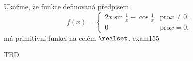 \begin{mathexam}{Ukažme, že funkce definovaná předpisem
  \begin{equation*}
    f(x) = 
    \begin{cases}
       2x\sin\frac{1}{x} - \cos\frac{1}{x} & \text{pro} x\neq0, \\
       0                                   & \text{pro} x=0.
   \end{cases}
  \end{equation*}
  má primitivní funkcí na celém \(\realset\).
  }{exam155} 

  {\centering
    \captionsetup{type=figure} 
    \label{mai:fig102}
  \par}
  
  TBD
\end{mathexam}